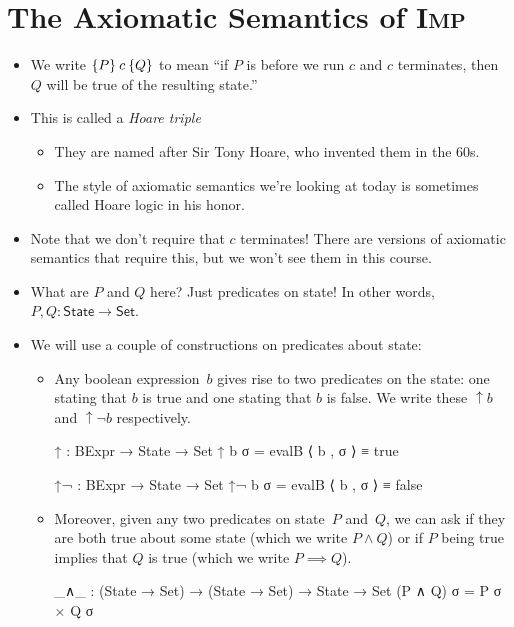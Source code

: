 \documentclass{lecturenotes}
\newcommand{\Imp}{\textsc{Imp}\xspace}
\newcommand{\hoare}[3]{\ensuremath{\{#1\}\mkern4mu#2\mkern4mu\{#3\}}}
\begin{document}
\section{The Axiomatic Semantics of \Imp}
\label{sec:axiom-semant-imp}

\begin{itemize}
\item We write $\hoare{P}{c}{Q}$ to mean ``if $P$ is before we run $c$ and $c$ terminates, then $Q$ will be true of the resulting state.''
\item This is called a \emph{Hoare triple}
  \begin{itemize}
  \item They are named after Sir Tony Hoare, who invented them in the 60s.
  \item The style of axiomatic semantics we're looking at today is sometimes called Hoare logic in his honor.
  \end{itemize}
\item Note that we don't require that $c$ terminates!
  There are versions of axiomatic semantics that require this, but we won't see them in this course.
\item What are $P$ and $Q$ here?
  Just predicates on state!
  In other words, $P, Q \colon \textsf{State} \to \textsf{Set}$.
\item We will use a couple of constructions on predicates about state:
  \begin{itemize}
  \item Any boolean expression~$b$ gives rise to two predicates on the state: one stating that $b$ is true and one stating that $b$ is false.
    We write these $\uparrow b$ and $\uparrow\lnot b$ respectively.
\begin{code}
↑ : BExpr → State → Set
↑ b σ = evalB ⟨ b , σ ⟩ ≡ true

↑¬ : BExpr → State → Set
↑¬ b σ = evalB ⟨ b , σ ⟩ ≡ false    
\end{code}
  \item Moreover, given any two predicates on state~$P$ and~$Q$, we can ask if they are both true about some state (which we write $P \land Q$) or if $P$ being true implies that $Q$ is true (which we write $P \implies Q$).
\begin{code}
_∧_ : (State → Set) → (State → Set) → State → Set
(P ∧ Q) σ = P σ × Q σ


\end{code}
\end{itemize}
\end{itemize}
\end{document}

